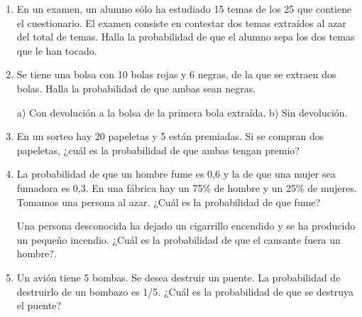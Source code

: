 \begin{adjustwidth}{5mm}{5mm}
\begin{enumerate}[PB. 1. ]
\hspace{-1cm}\vspace{1cm}

\item En un examen, un alumno sólo ha estudiado 15 temas de los 25 que contiene el cuestionario. El examen consiste en contestar dos temas extraídos al azar del total de temas. Halla la probabilidad de que el alumno sepa los dos temas que le han tocado.

\hspace{-1cm}\vspace{1cm}

\item Se tiene una bolsa con 10 bolas rojas y 6 negras, de la que se extraen dos bolas. Halla la probabilidad de que ambas sean negras.

a) Con devolución a la bolsa de la primera bola extraída. b) Sin devolución.

\hspace{-1cm}\vspace{1cm}
 

\item En un sorteo hay 20 papeletas y 5 están premiadas. Si se compran dos papeletas, ¿cuál es la probabilidad de que ambas tengan premio?

\hspace{-1cm}\vspace{1cm}


\item La probabilidad de que un hombre fume es 0,6 y la de que una mujer sea fumadora es 0,3. En una fábrica hay un 75\% de hombre y un 25\% de mujeres. Tomamos una persona al azar. ¿Cuál es la probabilidad de que fume?

Una persona desconocida ha dejado un cigarrillo encendido y se ha producido un pequeño incendio. ¿Cuál es la probabilidad de que el causante fuera un hombre?.

\hspace{-1cm}\vspace{1cm} 


\item Un avión tiene 5 bombas. Se desea destruir un puente. La probabilidad de destruirlo de un bombazo es 1/5. ¿Cuál es la probabilidad de que se destruya el puente?


\end{enumerate}
\end{adjustwidth}
